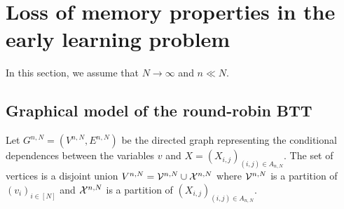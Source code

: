 
\section{Loss of memory properties in the early learning problem}

In this section, we assume that $N\to\infty$ and $n\ll N$.

\subsection{Graphical model of the round-robin BTT}
Let $G^{n,N}=(V^{n,N},E^{n,N})$ be the directed graph representing the conditional dependences between the variables $v$ and $X=(X_{i,j})_{(i,j)\in A_{n,N}}$. The set of vertices is a disjoint union $V^{n,N}=\mathcal{V}^{n,N}\cup \mathcal{X}^{n,N}$ where $\mathcal{V}^{n,N}$ is a partition of $(v_i)_{i\in[N]}$ and $\mathcal{X}^{n,N}$ is a partition of $(X_{i,j})_{(i,j)\in A_{n,N}}$. 


